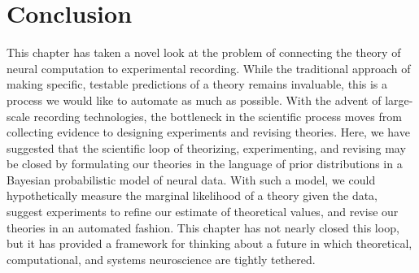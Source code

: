 \section{Conclusion}
This chapter has taken a novel look at the problem of connecting the
theory of neural computation to experimental recording. While the
traditional approach of making specific, testable predictions of
a theory remains invaluable, this is a process we would like to
automate as much as possible. With the advent of large-scale recording
technologies, the bottleneck in the scientific process moves from
collecting evidence to designing experiments and revising theories.
Here, we have suggested that the scientific loop of theorizing,
experimenting, and revising may be closed by formulating our theories
in the language of prior distributions in a Bayesian probabilistic model of
neural data. With such a model, we could hypothetically
measure the marginal likelihood of a theory given the data, 
suggest experiments to refine our estimate of theoretical values, and
revise our theories in an automated fashion. This chapter has not
nearly closed this loop, but it has provided a framework for thinking
about a future in which theoretical, computational, and systems
neuroscience are tightly tethered.


